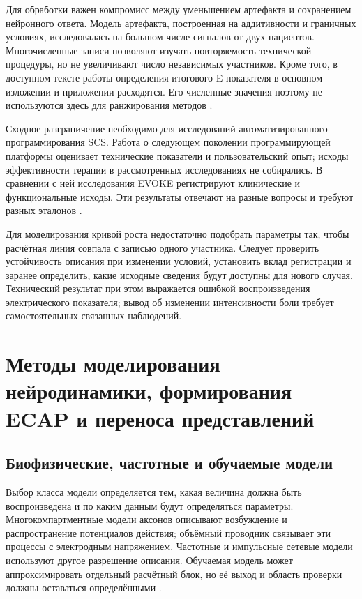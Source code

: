 Для обработки важен компромисс между уменьшением артефакта и сохранением нейронного ответа. Модель артефакта, построенная на аддитивности и граничных условиях, исследовалась на большом числе сигналов от двух пациентов. Многочисленные записи позволяют изучать повторяемость технической процедуры, но не увеличивают число независимых участников. Кроме того, в доступном тексте работы определения итогового E-показателя в основном изложении и приложении расходятся. Его численные значения поэтому не используются здесь для ранжирования методов \cite{s159}.

Сходное разграничение необходимо для исследований автоматизированного программирования SCS. Работа о следующем поколении программирующей платформы оценивает технические показатели и пользовательский опыт; исходы эффективности терапии в рассмотренных исследованиях не собирались. В сравнении с ней исследования EVOKE регистрируют клинические и функциональные исходы. Эти результаты отвечают на разные вопросы и требуют разных эталонов \cite{s162,s780,s781}.

Для моделирования кривой роста недостаточно подобрать параметры так, чтобы расчётная линия совпала с записью одного участника. Следует проверить устойчивость описания при изменении условий, установить вклад регистрации и заранее определить, какие исходные сведения будут доступны для нового случая. Технический результат при этом выражается ошибкой воспроизведения электрического показателя; вывод об изменении интенсивности боли требует самостоятельных связанных наблюдений.

\section{Методы моделирования нейродинамики, формирования ECAP и переноса представлений}
\label{sec:models-transfer}

\subsection{Биофизические, частотные и обучаемые модели}

Выбор класса модели определяется тем, какая величина должна быть воспроизведена и по каким данным будут определяться параметры. Многокомпартментные модели аксонов описывают возбуждение и распространение потенциалов действия; объёмный проводник связывает эти процессы с электродным напряжением. Частотные и импульсные сетевые модели используют другое разрешение описания. Обучаемая модель может аппроксимировать отдельный расчётный блок, но её выход и область проверки должны оставаться определёнными \cite{ecapmodel,s285}.

